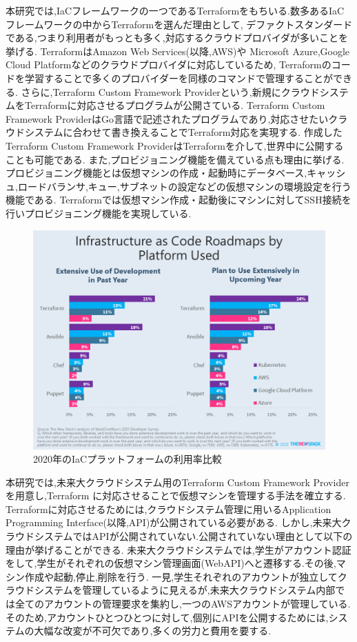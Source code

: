 \documentclass[11pt]{ujarticle}\sloppy
\begin{document}
本研究では,IaCフレームワークの一つであるTerraformをもちいる.数多あるIaCフレームワークの中からTerraformを選んだ理由として,
デファクトスタンダードである,つまり利用者がもっとも多く,対応するクラウドプロバイダが多いことを挙げる.
TerraformはAmazon Web Services(以降,AWS)や
Microsoft Azure,Google Cloud Platformなどのクラウドプロバイダに対応しているため,
Terraformのコードを学習することで多くのプロバイダーを同様のコマンドで管理することができる.
さらに,Terraform Custom Framework Providerという,新規にクラウドシステムをTerraformに対応させるプログラムが公開さている.
Terraform Custom Framework ProviderはGo言語で記述されたプログラムであり,対応させたいクラウドシステムに合わせて書き換えることでTerraform対応を実現する.
作成したTerraform Custom Framework ProviderはTerraformを介して,世界中に公開することも可能である.
また,プロビジョニング機能を備えている点も理由に挙げる.プロビジョニング機能とは仮想マシンの作成・起動時にデータベース,キャッシュ,ロードバランサ,キュー,サブネットの設定などの仮想マシンの環境設定を行う機能である.
Terraformでは仮想マシン作成・起動後にマシンに対してSSH接続を行いプロビジョニング機能を実現している.


\begin{figure}[h]
	\includegraphics[width=1\linewidth]{./images/terraform.png}
	\caption{2020年のIaCプラットフォームの利用率比較\cite{THENEWSTACK}}
	\label{fig:terraform}
\end{figure}


本研究では,未来大クラウドシステム用のTerraform Custom Framework Providerを用意し,Terraform に対応させることで仮想マシンを管理する手法を確立する.
Terraformに対応させるためには,クラウドシステム管理に用いるApplication Programming Interface(以降,API)が公開されている必要がある.
しかし,未来大クラウドシステムではAPIが公開されていない.公開されていない理由として以下の理由が挙げることができる.
未来大クラウドシステムでは,学生がアカウント認証をして,学生がそれぞれの仮想マシン管理画面(WebAPI)へと遷移する.その後,マシン作成や起動,停止,削除を行う.
一見,学生それぞれのアカウントが独立してクラウドシステムを管理しているように見えるが,未来大クラウドシステム内部では全てのアカウントの管理要求を集約し,一つのAWSアカウントが管理している.
そのため,アカウントひとつひとつに対して,個別にAPIを公開するためには,システムの大幅な改変が不可欠であり,多くの労力と費用を要する.
\end{document}
